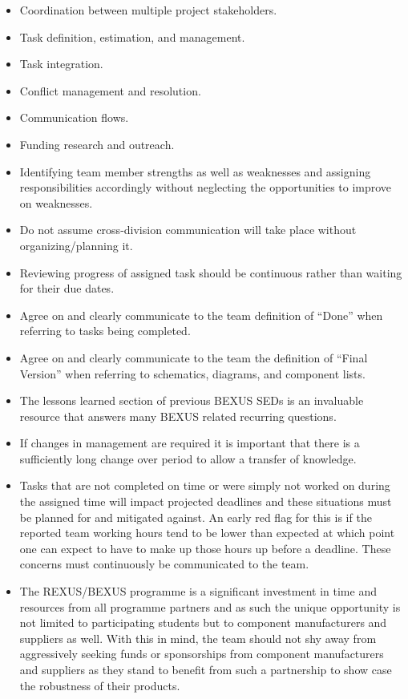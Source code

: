 \documentclass[a4paper,12pt,oneside]{article} %
\begin{document}
\begin{itemize}
    \item Coordination between multiple project stakeholders.
    \item Task definition, estimation, and management.
    \item Task integration.
    \item Conflict management and resolution.
    \item Communication flows.
    \item Funding research and outreach.
    \item Identifying team member strengths as well as weaknesses and assigning responsibilities accordingly without neglecting the opportunities to improve on weaknesses. 
    \item Do not assume cross-division communication will take place without organizing/planning it.
    \item Reviewing progress of assigned task should be continuous rather than waiting for their due dates.
    \item Agree on and clearly communicate to the team definition of \enquote{Done} when referring to tasks being completed.
    \item Agree on and clearly communicate to the team the definition of \enquote{Final Version} when referring to schematics, diagrams, and component lists.
    \item The lessons learned section of previous BEXUS SEDs is an invaluable resource that answers many BEXUS related recurring questions.
    \item If changes in management are required it is important that there is a sufficiently long change over period to allow a transfer of knowledge.
    \item Tasks that are not completed on time or were simply not worked on during the assigned time will impact projected deadlines and these situations must be planned for and mitigated against. An early red flag for this is if the reported team working hours tend to be lower than expected at which point one can expect to have to make up those hours up before a deadline. These concerns must continuously be communicated to the team.
    \item The REXUS/BEXUS programme is a significant investment in time and resources from all programme partners and as such the unique opportunity is not limited to participating students but to component manufacturers and suppliers as well. With this in mind, the team should not shy away from aggressively seeking funds or sponsorships from component manufacturers and suppliers as they stand to benefit from such a partnership to show case the robustness of their products.

\end{itemize}
\end{document}
